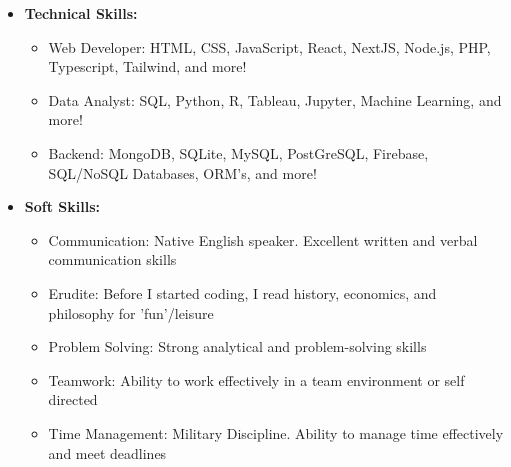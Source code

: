 
\begin{itemize}
  \item \textbf{Technical Skills:}
  \begin{itemize}
    \item Web Developer: HTML, CSS, JavaScript, React, NextJS, Node.js, PHP, Typescript, Tailwind, and more!
    \item Data Analyst: SQL, Python, R, Tableau, Jupyter, Machine Learning, and more!
    \item Backend: MongoDB, SQLite, MySQL, PostGreSQL, Firebase, SQL/NoSQL Databases, ORM's, and more!
  \end{itemize}
  \item \textbf{Soft Skills:}
    \begin{itemize}
      \item Communication: Native English speaker. Excellent written and verbal communication skills
      \item Erudite: Before I started coding, I read history, economics, and philosophy for 'fun'/leisure
      \item Problem Solving: Strong analytical and problem-solving skills
      \item Teamwork: Ability to work effectively in a team environment or self directed
      \item Time Management: Military Discipline. Ability to manage time effectively and meet deadlines
    \end{itemize}
\end{itemize}
